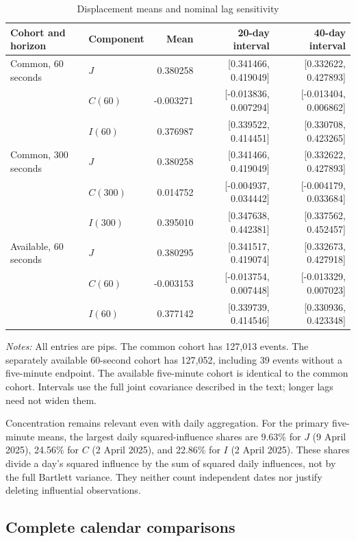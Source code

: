 \documentclass[12pt,letterpaper]{article}
\begin{document}
\begin{table}[htbp]
\centering
\caption{Displacement means and nominal lag sensitivity}
\label{tab:lagchecks}
\small\setlength{\tabcolsep}{3pt}
\begin{tabular}{llrrr}
\toprule
Cohort and horizon & Component & Mean & 20-day interval & 40-day interval\\
\midrule
Common, 60 seconds & $J$ & 0.380258 & [0.341466, 0.419049] & [0.332622, 0.427893]\\
 & $C(60)$ & -0.003271 & [-0.013836, 0.007294] & [-0.013404, 0.006862]\\
 & $I(60)$ & 0.376987 & [0.339522, 0.414451] & [0.330708, 0.423265]\\
Common, 300 seconds & $J$ & 0.380258 & [0.341466, 0.419049] & [0.332622, 0.427893]\\
 & $C(300)$ & 0.014752 & [-0.004937, 0.034442] & [-0.004179, 0.033684]\\
 & $I(300)$ & 0.395010 & [0.347638, 0.442381] & [0.337562, 0.452457]\\
Available, 60 seconds & $J$ & 0.380295 & [0.341517, 0.419074] & [0.332673, 0.427918]\\
 & $C(60)$ & -0.003153 & [-0.013754, 0.007448] & [-0.013329, 0.007023]\\
 & $I(60)$ & 0.377142 & [0.339739, 0.414546] & [0.330936, 0.423348]\\
\bottomrule
\end{tabular}
\begin{minipage}{0.98\linewidth}\small
\emph{Notes:} All entries are pips. The common cohort has 127,013 events. The separately available 60-second cohort has 127,052, including 39 events without a five-minute endpoint. The available five-minute cohort is identical to the common cohort. Intervals use the full joint covariance described in the text; longer lags need not widen them.
\end{minipage}
\end{table}

Concentration remains relevant even with daily aggregation. For the primary five-minute means, the largest daily squared-influence shares are 9.63\% for $J$ (9 April 2025), 24.56\% for $C$ (2 April 2025), and 22.86\% for $I$ (2 April 2025). These shares divide a day's squared influence by the sum of squared daily influences, not by the full Bartlett variance. They neither count independent dates nor justify deleting influential observations.

\subsection{Complete calendar comparisons}
\label{app:quarters}
\end{document}
